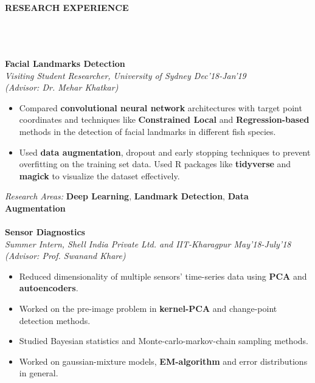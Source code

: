 \documentclass[letter,10pt]{book}
\newcommand{\lsep}{-0.5cm}
\newcommand{\resheading}[1]{{\small \colorbox{mygrey}{\begin{minipage}{0.975\textwidth}{\textbf{#1 \vphantom{p\^{E}}}}\end{minipage}}}}
\begin{document}
\hfill 
\hspace{0.5cm}\\
\resheading{\textbf{RESEARCH EXPERIENCE} }\\[\lsep]
\\\\
\large \textbf{Facial Landmarks Detection} \normalsize \\
\emph{Visiting Student Researcher, University of Sydney \hfill Dec'18-Jan'19 } \\ 
\emph{(Advisor: Dr. Mehar Khatkar)} \\[-2em]
\begin{itemize}
\item Compared \textbf{convolutional neural network} architectures with target point coordinates and techniques like \textbf{Constrained Local} and \textbf{Regression-based} methods in the detection of facial landmarks in different fish species.\\[-2em]
\item Used \textbf{data augmentation}, dropout and early stopping techniques to prevent overfitting on the training set data. Used R packages like \textbf{tidyverse} and \textbf{magick} to visualize the dataset effectively.\\[-1.8em]
\end{itemize}
\emph{Research Areas:}  \textbf{Deep Learning}, \textbf{Landmark Detection},
\textbf{Data Augmentation}
\\\\[-0.5em]
\large \textbf{Sensor Diagnostics} \normalsize \\
\emph{Summer Intern, Shell India Private Ltd. and IIT-Kharagpur \hfill May'18-July'18} \\ 
\emph{(Advisor: Prof. Swanand Khare)} \\[-2em]
\begin{itemize}
\item Reduced dimensionality of multiple sensors' time-series data using \textbf{PCA} and  \textbf{autoencoders}.\\[-2em]
\item Worked on the pre-image problem in  \textbf{kernel-PCA} and change-point detection methods.\\[-2em]
\item Studied Bayesian statistics and Monte-carlo-markov-chain sampling methods.\\[-2em]
\item Worked on gaussian-mixture models, \textbf{EM-algorithm} and error distributions in general.\\[-1.8em]
\end{itemize}
\end{document}

